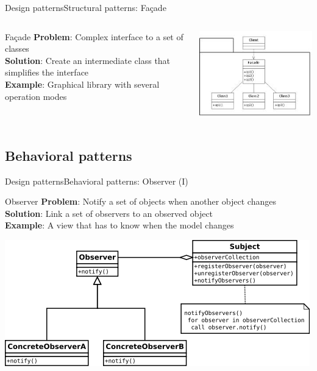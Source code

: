 \documentclass[10pt,compress]{beamer} %
\begin{document}
\begin{frame}{Design patterns}{Structural patterns: Fa\c{c}ade}
    \begin{columns}
	   \begin{block}{Fa\c{c}ade}
			\textbf{Problem}: Complex interface to a set of classes\\
			\textbf{Solution}: Create an intermediate class that simplifies the interface\\
			\textbf{Example}: Graphical library with several operation modes\\
		\end{block}
			\centering\includegraphics[width=\linewidth]{figs/facade.jpeg}
	\end{columns}
\end{frame}

\subsection[Behavioral patterns]{Behavioral patterns}

\begin{frame}{Design patterns}{Behavioral patterns: Observer (I)}
	   \begin{block}{Observer}
			\textbf{Problem}: Notify a set of objects when another object changes\\
			\textbf{Solution}: Link a set of observers to an observed object\\
			\textbf{Example}: A view that has to know when the model changes\\
		\end{block}
		\bigskip
		\centering\includegraphics[width=0.7\linewidth]{figs/observer}
\end{frame}
\end{document}
